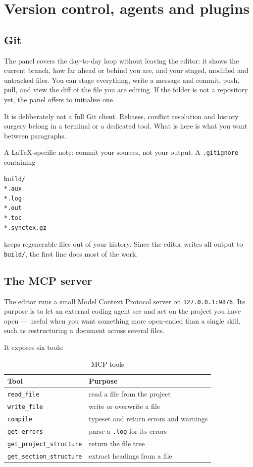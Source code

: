 \section{Version control, agents and plugins}
\label{sec:integrations}

\subsection{Git}

The  panel covers the day-to-day loop without leaving the editor: it
shows the current branch, how far ahead or behind you are, and your staged,
modified and untracked files. You can stage everything, write a message and
commit, push, pull, and view the diff of the file you are editing. If the
folder is not a repository yet, the panel offers to initialise one.

It is deliberately not a full Git client. Rebases, conflict resolution and
history surgery belong in a terminal or a dedicated tool. What is here is what
you want between paragraphs.

A \LaTeX{}-specific note: commit your sources, not your output. A
\texttt{.gitignore} containing

\begin{lstlisting}
build/
*.aux
*.log
*.out
*.toc
*.synctex.gz
\end{lstlisting}

keeps regenerable files out of your history. Since the editor writes all output
to \texttt{build/}, the first line does most of the work.

\subsection{The MCP server}

The editor runs a small Model Context Protocol server on
\texttt{127.0.0.1:9876}. Its purpose is to let an external coding agent see and
act on the project you have open --- useful when you want something more
open-ended than a single skill, such as restructuring a document across several
files.

It exposes six tools:

\begin{table}[htbp]
  \centering
  \caption{MCP tools}
  \label{tab:mcp}
  \begin{tabular}{ll}
    \toprule
    \textbf{Tool} & \textbf{Purpose} \\
    \midrule
    \texttt{read\_file}             & read a file from the project \\
    \texttt{write\_file}            & write or overwrite a file \\
    \texttt{compile}                & typeset and return errors and warnings \\
    \texttt{get\_errors}            & parse a \texttt{.log} for its errors \\
    \texttt{get\_project\_structure} & return the file tree \\
    \texttt{get\_section\_structure} & extract headings from a file \\
    \bottomrule
  \end{tabular}
\end{table}


